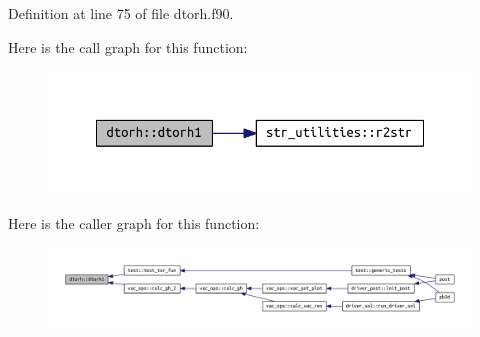 Definition at line 75 of file dtorh.\+f90.

Here is the call graph for this function\+:\nopagebreak
\begin{figure}[H]
\begin{center}
\leavevmode
\includegraphics[width=348pt]{namespacedtorh_af3f58b6705da916bfbaf7cc4ea05f610_cgraph}
\end{center}
\end{figure}
Here is the caller graph for this function\+:\nopagebreak
\begin{figure}[H]
\begin{center}
\leavevmode
\includegraphics[width=350pt]{namespacedtorh_af3f58b6705da916bfbaf7cc4ea05f610_icgraph}
\end{center}
\end{figure}
